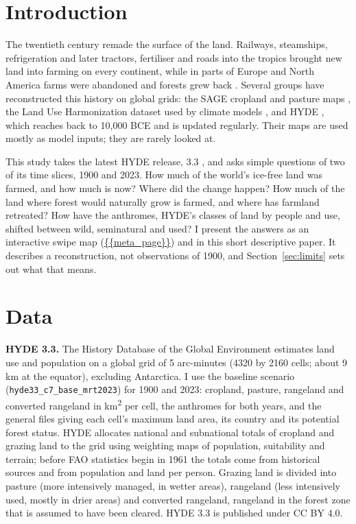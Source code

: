 \documentclass[11pt,a4paper]{article}
\begin{document}
\section{Introduction}
The twentieth century remade the surface of the land. Railways, steamships, refrigeration and later tractors, fertiliser and roads into the tropics brought new land into farming on every continent, while in parts of Europe and North America farms were abandoned and forests grew back \citep{williams,ramankutty}. Several groups have reconstructed this history on global grids: the SAGE cropland and pasture maps \citep{ramankutty}, the Land Use Harmonization dataset used by climate models \citep{luh2}, and HYDE \citep{hyde32}, which reaches back to 10,000 BCE and is updated regularly. Their maps are used mostly as model inputs; they are rarely looked at.

This study takes the latest HYDE release, 3.3 \citep{hyde33}, and asks simple questions of two of its time slices, 1900 and 2023. How much of the world's ice-free land was farmed, and how much is now? Where did the change happen? How much of the land where forest would naturally grow is farmed, and where has farmland retreated? How have the anthromes, HYDE's classes of land by people and use, shifted between wild, seminatural and used? I present the answers as an interactive swipe map (\url{{{meta_page}}}) and in this short descriptive paper. It describes a reconstruction, not observations of 1900, and Section~\ref{sec:limits} sets out what that means.

\section{Data}
\textbf{HYDE 3.3.} The History Database of the Global Environment \citep{hyde33,hyde32} estimates land use and population on a global grid of 5 arc-minutes (4320 by 2160 cells; about 9 km at the equator), excluding Antarctica. I use the baseline scenario (\texttt{hyde33\_c7\_base\_mrt2023}) for 1900 and 2023: cropland, pasture, rangeland and converted rangeland in km\textsuperscript{2} per cell, the anthromes for both years, and the general files giving each cell's maximum land area, its country and its potential forest status. HYDE allocates national and subnational totals of cropland and grazing land to the grid using weighting maps of population, suitability and terrain; before FAO statistics begin in 1961 the totals come from historical sources and from population and land per person. Grazing land is divided into pasture (more intensively managed, in wetter areas), rangeland (less intensively used, mostly in drier areas) and converted rangeland, rangeland in the forest zone that is assumed to have been cleared. HYDE 3.3 is published under CC BY 4.0.
\end{document}
